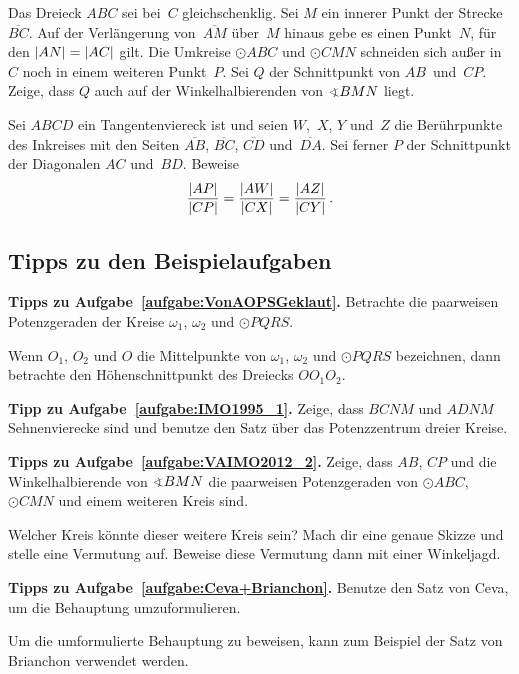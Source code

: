\begin{aufgabe*}\label{aufgabe:VAIMO2012_2}
	Das Dreieck $ABC$ sei bei~$C$ gleichschenklig. Sei $M$ ein innerer Punkt der Strecke~$\overline{BC}$. Auf der Verlängerung von~$\overline{AM}$ über~$M$ hinaus gebe es einen Punkt~$N$, für den $\lvert AN\rvert=\lvert AC\rvert$ gilt. Die Umkreise $\odot ABC$ und $\odot CMN$ schneiden sich außer in~$C$ noch in einem weiteren Punkt~$P$. Sei $Q$ der Schnittpunkt von $AB$~und~$CP$. Zeige, dass $Q$ auch auf der Winkelhalbierenden von $\winkel BMN$ liegt.
\end{aufgabe*}

\begin{aufgabe*}\label{aufgabe:Ceva+Brianchon}
	Sei $ABCD$ ein Tangentenviereck ist und seien $W$,~$X$, $Y$ und~$Z$ die Berührpunkte des Inkreises mit den Seiten $\overline{AB}$, $\overline{BC}$, $\overline{CD}$ und~$\overline{DA}$. Sei ferner $P$ der Schnittpunkt der Diagonalen $AC$ und~$BD$. Beweise
	\begin{equation*}
		\frac{\lvert AP\rvert}{\lvert CP\rvert}=\frac{\lvert AW\rvert}{\lvert CX\rvert}=\frac{\lvert AZ\rvert}{\lvert CY\rvert}\,.
	\end{equation*}
\end{aufgabe*}

\subsection*{Tipps zu den Beispielaufgaben}

\textbf{Tipps zu Aufgabe~\ref{aufgabe:VonAOPSGeklaut}.} Betrachte die paarweisen Potenzgeraden der Kreise $\omega_1$, $\omega_2$ und $\odot PQRS$.

Wenn $O_1$, $O_2$ und $O$ die Mittelpunkte von $\omega_1$, $\omega_2$ und $\odot PQRS$ bezeichnen, dann betrachte den Höhenschnittpunkt des Dreiecks $OO_1O_2$.

\textbf{Tipp zu Aufgabe~\ref{aufgabe:IMO1995_1}.} Zeige, dass $BCNM$ und $ADNM$ Sehnenvierecke sind und benutze den Satz über das Potenzzentrum dreier Kreise.

\textbf{Tipps zu Aufgabe~\ref{aufgabe:VAIMO2012_2}.} Zeige, dass $AB$, $CP$ und die Winkelhalbierende von $\winkel BMN$ die paarweisen Potenzgeraden von $\odot ABC$, $\odot CMN$ und einem weiteren Kreis sind.

Welcher Kreis könnte dieser weitere Kreis sein? Mach dir eine genaue Skizze und stelle eine Vermutung auf. Beweise diese Vermutung dann mit einer Winkeljagd.

\textbf{Tipps zu Aufgabe~\ref{aufgabe:Ceva+Brianchon}.} Benutze den Satz von Ceva, um die Behauptung umzuformulieren.

Um die umformulierte Behauptung zu beweisen, kann zum Beispiel der Satz von Brianchon verwendet werden.